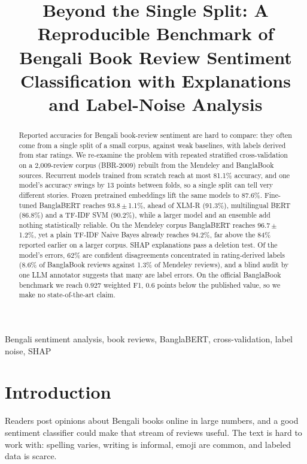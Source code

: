 \documentclass[conference,a4paper]{IEEEtran}
\newcommand{\pmstd}[2]{#1\,$\pm$\,#2}
\begin{document}
\title{Beyond the Single Split: A Reproducible Benchmark of Bengali Book Review Sentiment Classification with Explanations and Label-Noise Analysis}

\author{
}

\maketitle

\begin{abstract}
Reported accuracies for Bengali book-review sentiment are hard to compare: they often come from a single split of a small corpus, against weak baselines, with labels derived from star ratings. We re-examine the problem with repeated stratified cross-validation on a 2,009-review corpus (BBR-2009) rebuilt from the Mendeley and BanglaBook sources. Recurrent models trained from scratch reach at most 81.1\% accuracy, and one model's accuracy swings by 13 points between folds, so a single split can tell very different stories. Frozen pretrained embeddings lift the same models to 87.6\%. Fine-tuned BanglaBERT reaches \pmstd{93.8}{1.1}\%, ahead of XLM-R (91.3\%), multilingual BERT (86.8\%) and a TF-IDF SVM (90.2\%), while a larger model and an ensemble add nothing statistically reliable. On the Mendeley corpus BanglaBERT reaches \pmstd{96.7}{1.2}\%, yet a plain TF-IDF Naive Bayes already reaches 94.2\%, far above the 84\% reported earlier on a larger corpus. SHAP explanations pass a deletion test. Of the model's errors, 62\% are confident disagreements concentrated in rating-derived labels (8.6\% of BanglaBook reviews against 1.3\% of Mendeley reviews), and a blind audit by one LLM annotator suggests that many are label errors. On the official BanglaBook benchmark we reach 0.927 weighted F1, 0.6 points below the published value, so we make no state-of-the-art claim.
\end{abstract}

\begin{IEEEkeywords}
Bengali sentiment analysis, book reviews, BanglaBERT, cross-validation, label noise, SHAP
\end{IEEEkeywords}

\section{Introduction}
Readers post opinions about Bengali books online in large numbers, and a good sentiment classifier could make that stream of reviews useful. The text is hard to work with: spelling varies, writing is informal, emoji are common, and labeled data is scarce.
\end{document}

